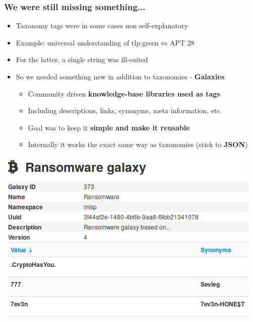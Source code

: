 \begin{frame}
\frametitle{We were still missing something...}
    \begin{itemize}
       \item Taxonomy tags were in some cases non self-explanatory
       \item Example: universal understanding of tlp:green vs APT 28
       \item For the latter, a single string was ill-suited
       \item So we needed something new in addition to taxonomies - \textbf{Galaxies}
        \begin{itemize}
            \item Community driven \textbf{knowledge-base libraries used as tags}
            \item Including descriptions, links, synonyms, meta information, etc. 
            \item Goal was to keep it \textbf{simple and make it reusable}
            \item Internally it works the exact same way as taxonomies (stick to \textbf{JSON})
        \end{itemize}
    \end{itemize}
    \begin{center}
        \hspace{10em}
        \includegraphics[scale=0.30]{galaxy-ransomware.png}
    \end{center}
\end{frame}

